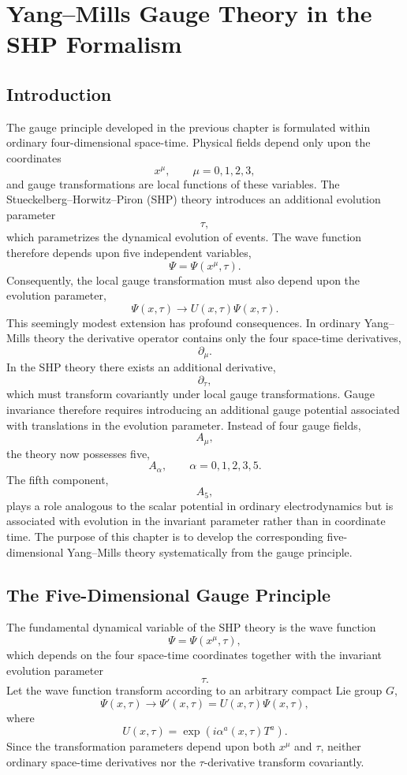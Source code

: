 \chapter{Yang--Mills Gauge Theory in the SHP Formalism}
\label{ch:shpym}
\section{Introduction}
The gauge principle developed in the previous chapter is formulated
within ordinary four-dimensional space-time. Physical fields depend only
upon the coordinates
\[x^\mu,\qquad\mu=0,1,2,3,\]
and gauge transformations are local functions of these variables.
The Stueckelberg--Horwitz--Piron (SHP) theory introduces an additional
evolution parameter
\[\tau,\]
which parametrizes the dynamical evolution of events. The wave function
therefore depends upon five independent variables,
\[\Psi=\Psi(x^\mu,\tau).\]
Consequently, the local gauge transformation must also depend upon the
evolution parameter,
\[\boxed{\Psi(x,\tau)\rightarrow U(x,\tau)\Psi(x,\tau).}\]
This seemingly modest extension has profound consequences.
In ordinary Yang--Mills theory the derivative operator contains only the
four space-time derivatives,
\[\partial_\mu.\]
In the SHP theory there exists an additional derivative,
\[\partial_\tau,\]
which must transform covariantly under local gauge transformations.
Gauge invariance therefore requires introducing an additional gauge
potential associated with translations in the evolution parameter.
Instead of four gauge fields,
\[A_\mu,\]
the theory now possesses five,
\[\boxed{A_\alpha,\qquad\alpha=0,1,2,3,5.}\]
The fifth component,
\[A_5,\]
plays a role analogous to the scalar potential in ordinary
electrodynamics but is associated with evolution in the invariant
parameter rather than in coordinate time.
The purpose of this chapter is to develop the corresponding
five-dimensional Yang--Mills theory systematically from the gauge
principle.
\section{The Five-Dimensional Gauge Principle}
The fundamental dynamical variable of the SHP theory is the wave function
\[\Psi=\Psi(x^\mu,\tau),\]
which depends on the four space-time coordinates together with the
invariant evolution parameter
\[\tau .\]
Let the wave function transform according to an arbitrary compact Lie
group \(G\),
\[\boxed{\Psi(x,\tau)\longrightarrow\Psi'(x,\tau)=U(x,\tau)\Psi(x,\tau),}\]
where
\[U(x,\tau)=\exp\!\left(i\alpha^a(x,\tau)T^a\right).\]
Since the transformation parameters depend upon both \(x^\mu\) and
\(\tau\), neither ordinary space-time derivatives nor the
\(\tau\)-derivative transform covariantly.
